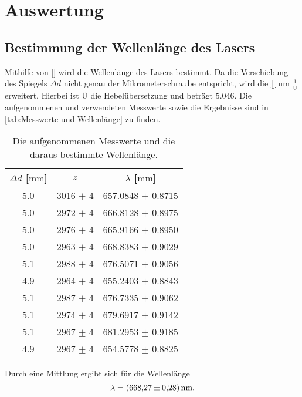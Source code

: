 \section{Auswertung}
\label{sec:Auswertung}

\subsection{Bestimmung der Wellenlänge des Lasers}
\label{subsec:Wellenlänge}

Mithilfe von \autoref{} wird die Wellenlänge des Lasers bestimmt.
Da die Verschiebung des Spiegels $\Delta d$ nicht genau der Mikrometerschraube entspricht, wird die \autoref{} um $\frac{1}{Ü}$ erweitert.
Hierbei ist $Ü$ die Hebelübersetzung und beträgt $5.046$.
Die aufgenommenen und verwendeten Messwerte sowie die Ergebnisse sind in \autoref{tab:Messwerte und Wellenlänge} zu finden.

\begin{table}
  \centering
  \caption{Die aufgenommenen Messwerte und die daraus bestimmte Wellenlänge.}
  \label{tab:Messwerte und Wellenlänge}
  \begin{tabular}{c c c}
    \toprule
    {$\Delta d$ [$\si{\milli\metre}$]} & {$z$} & {$\lambda$ [$\si{\milli\metre}$]} \\
    \midrule
    5.0     &       3016 $\pm$ 4    &   657.0848 $\pm$ 0.8715\\
    5.0     &       2972 $\pm$ 4    &   666.8128 $\pm$ 0.8975\\
    5.0     &       2976 $\pm$ 4    &   665.9166 $\pm$ 0.8950\\
    5.0     &       2963 $\pm$ 4    &   668.8383 $\pm$ 0.9029\\
    5.1     &       2988 $\pm$ 4    &   676.5071 $\pm$ 0.9056\\
    4.9     &       2964 $\pm$ 4    &   655.2403 $\pm$ 0.8843\\
    5.1     &       2987 $\pm$ 4    &   676.7335 $\pm$ 0.9062\\
    5.1     &       2974 $\pm$ 4    &   679.6917 $\pm$ 0.9142\\
    5.1     &       2967 $\pm$ 4    &   681.2953 $\pm$ 0.9185\\
    4.9     &       2967 $\pm$ 4    &   654.5778 $\pm$ 0.8825\\
    \bottomrule
  \end{tabular}
\end{table}

\noindent
Durch eine Mittlung ergibt sich für die Wellenlänge
\begin{equation*}
  \lambda = \SI{668.27 \pm 0.28}{\nano\metre}.
\end{equation*}

